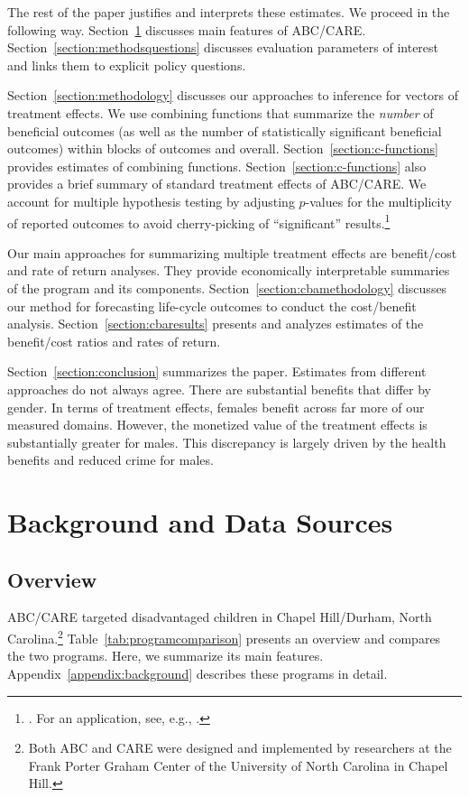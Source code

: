 The rest of the paper justifies and interprets these estimates. We proceed in the following way. Section~\ref{section:background} discusses main features of ABC/CARE. Section~\ref{section:methodsquestions} discusses evaluation parameters of interest and links them to explicit policy questions.

Section~\ref{section:methodology} discusses our approaches to inference for vectors of treatment effects. We use  combining functions that summarize the \emph{number} of beneficial outcomes (as well as the number of statistically significant beneficial outcomes) within blocks of outcomes and overall. Section~\ref{section:c-functions} provides estimates of combining functions. Section~\ref{section:c-functions} also provides a brief summary of standard treatment effects of ABC/CARE. We account for multiple hypothesis testing by adjusting $p$-values for the multiplicity of reported outcomes to avoid cherry-picking of ``significant'' results.\footnote{\cite{Romano_Wolf_2005_JASA}. For an application, see, e.g., \cite{Heckman_Moon_etal_2010_QE}.}

Our main approaches for summarizing multiple treatment effects are benefit/cost and rate of return analyses. They provide economically interpretable summaries of the program and its components. Section~\ref{section:cbamethodology} discusses our method for forecasting life-cycle outcomes to conduct the cost/benefit analysis. Section~\ref{section:cbaresults} presents and analyzes estimates of the benefit/cost ratios and rates of return.

Section~\ref{section:conclusion} summarizes the paper. Estimates from different approaches do not always agree. There are substantial benefits that differ by gender. In terms of treatment effects, females benefit across far more of our measured domains. However, the monetized value of the treatment effects is substantially greater for males. This discrepancy is largely driven by the health benefits and reduced crime for males.

\section[Background and Data Sources]{Background and Data Sources} \label{section:background}

\subsection{Overview}

ABC/CARE targeted disadvantaged children in Chapel Hill/Durham, North Carolina.\footnote{Both ABC and CARE were designed and implemented by researchers at the Frank Porter Graham Center of the University of North Carolina in Chapel Hill.} Table~\ref{tab:programcomparison} presents an overview and compares the two programs. Here, we summarize its main features. Appendix~\ref{appendix:background} describes these programs in detail.

